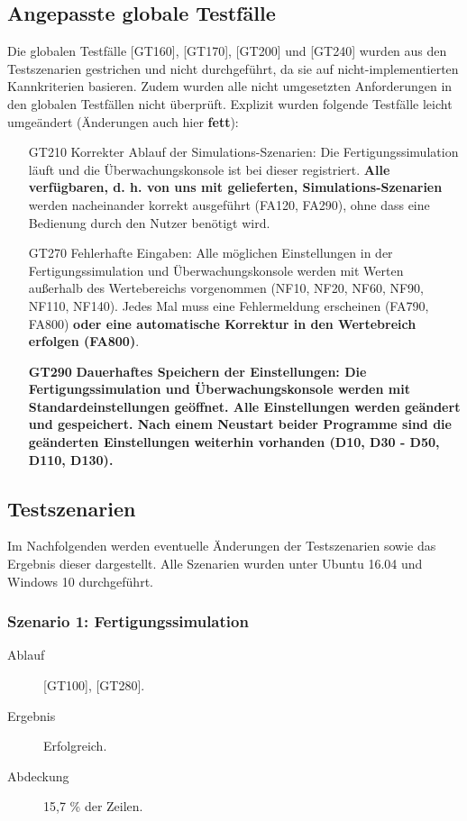 \documentclass[parskip=full]{scrartcl}
\begin{document}
\subsection{Angepasste globale Testfälle}
Die globalen Testfälle [GT160], [GT170], [GT200] und [GT240] wurden aus den Testszenarien gestrichen und nicht durchgeführt, da sie auf nicht-implementierten Kannkriterien basieren.
Zudem wurden alle nicht umgesetzten Anforderungen in den globalen Testfällen nicht überprüft. Explizit wurden folgende Testfälle leicht umgeändert (Änderungen auch hier \textbf{fett}):

\begin{enumerate}
 \item[GT210] Korrekter Ablauf der Simulations-Szenarien: Die Fertigungssimulation läuft und die Überwachungskonsole ist bei dieser registriert. \textbf{Alle verfügbaren, d. h. von uns mit gelieferten, Simulations-Szenarien} werden nacheinander korrekt ausgeführt (FA120, FA290), ohne dass eine Bedienung durch den Nutzer benötigt wird.
 \item[GT270] Fehlerhafte Eingaben: Alle möglichen Einstellungen in der Fertigungssimulation und Überwachungskonsole werden mit Werten außerhalb des Wertebereichs vorgenommen (NF10, NF20, NF60, NF90, NF110, NF140). Jedes Mal muss eine Fehlermeldung erscheinen (FA790, FA800) \textbf{oder eine automatische Korrektur in den Wertebreich erfolgen (FA800)}.
 \item[\textbf{GT290}] \textbf{Dauerhaftes Speichern der Einstellungen: Die Fertigungssimulation und Überwachungskonsole werden mit Standardeinstellungen geöffnet. Alle Einstellungen werden geändert und gespeichert. Nach einem Neustart beider Programme sind die geänderten Einstellungen weiterhin vorhanden (D10, D30 - D50, D110, D130).}
\end{enumerate}

\subsection{Testszenarien}
Im Nachfolgenden werden eventuelle Änderungen der Testszenarien sowie das Ergebnis dieser dargestellt. Alle Szenarien wurden unter Ubuntu 16.04 und Windows 10 durchgeführt.

\subsubsection{Szenario 1: Fertigungssimulation}
\begin{description}
 \item[Ablauf] [GT100], [GT280].
 \item[Ergebnis] Erfolgreich.
 \item[Abdeckung] 15,7 \% der Zeilen.
\end{description}
\end{document}
